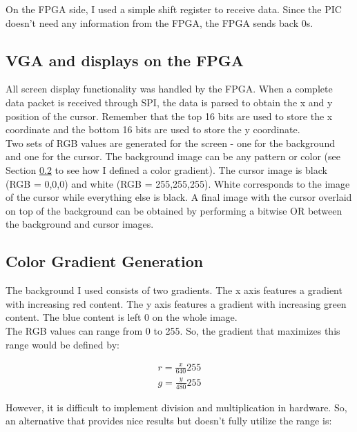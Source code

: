 \documentclass[11pt]{article}
\begin{document}
On the FPGA side, I used a simple shift register to receive data. Since the PIC doesn't need any information from the FPGA, the FPGA sends back 0s. \\

\subsection{VGA and displays on the FPGA}

All screen display functionality was handled by the FPGA. When a complete data packet is received through SPI, the data is parsed to obtain the x and y position of the cursor. Remember that the top 16 bits are used to store the x coordinate and the bottom 16 bits are used to store the y coordinate. \\

Two sets of RGB values are generated for the screen - one for the background and one for the cursor. The background image can be any pattern or color (see Section \ref{sec:gradient} to see how I defined a color gradient). The cursor image is black (RGB = 0,0,0) and white (RGB = 255,255,255). White corresponds to the image of the cursor while everything else is black. A final image with the cursor overlaid on top of the background can be obtained by performing a bitwise OR between the background and cursor images. \\

\subsection{Color Gradient Generation}
\label{sec:gradient}

The background I used consists of two gradients. The x axis features a gradient with increasing red content. The y axis features a gradient with increasing green content. The blue content is left 0 on the whole image. \\

The RGB values can range from 0 to 255. So, the gradient that maximizes this range would be defined by:

\begin{eqnarray*}
r = \frac{x}{640}255 \\
g = \frac{y}{480}255 
\end{eqnarray*}

However, it is difficult to implement division and multiplication in hardware. So, an alternative that provides nice results but doesn't fully utilize the range is:
\end{document}
